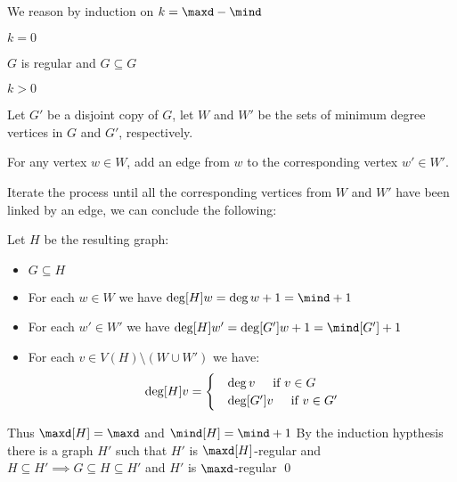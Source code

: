 \begin{prf}
    We reason by induction on $k = \maxd - \mind$

    \boldmath $k = 0$ \unboldmath
    
    $G$ is regular and $G \subseteq G$
    
    \boldmath $k > 0$ \unboldmath

    Let $G'$ be a disjoint copy of $G$, let $W$ and $W'$ be the sets of minimum degree vertices in $G$ and $G'$, respectively.

    For any vertex $w \in W$, add an edge from $w$ to the corresponding vertex $w' \in W'$.

    Iterate the process until all the corresponding vertices from $W$ and $W'$ have been linked by an edge, we can conclude the following:

    Let $H$ be the resulting graph:
    \begin{itemize}
        \item $G \subseteq H$
        \item For each $w \in W$ we have $\deg[H]{w} = \deg{w} + 1 = \mind + 1$
        \item For each $w' \in W'$ we have $\deg[H]{w'} = \deg[G']{w} + 1 = \mind[G'] + 1$
        \item For each $v \in V(H) \setminus (W \cup W')$ we have:
        \begin{equation*}
            \deg[H]{v} =
            \begin{cases}
                &\deg{v} \text{\hspace{5mm}if } v \in G\\
                &\deg[G']{v} \text{\hspace{5mm}if } v \in G'
            \end{cases}
        \end{equation*}
    \end{itemize}
    Thus $\maxd[H] = \maxd$ and $\mind[H] = \mind + 1$
    By the induction hypthesis there is a graph $H'$ such that $H'$ is $\maxd[H]$-regular and $H \subseteq H' \implies G \subseteq H \subseteq H'$ and $H'$ is $\maxd$-regular \qed
\end{prf}
